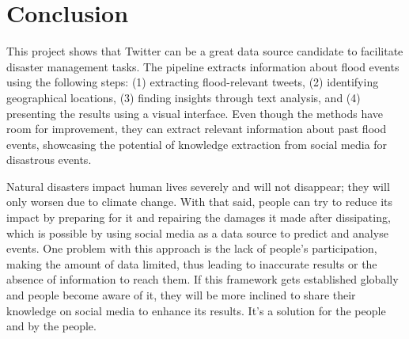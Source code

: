 \chapter{Conclusion}%
This project shows that Twitter can be a great data source candidate to facilitate disaster
management tasks. The pipeline extracts information about flood events using the following steps:
(1) extracting flood-relevant tweets, (2) identifying geographical locations, (3) finding insights
through text analysis, and (4) presenting the results using a visual interface. Even though the
methods have room for improvement, they can extract relevant information about past flood events,
showcasing the potential of knowledge extraction from social media for disastrous events.

Natural disasters impact human lives severely and will not disappear; they will only worsen due to
climate change. With that said, people can try to reduce its impact by preparing for it and
repairing the damages it made after dissipating, which is possible by using social media as a data
source to predict and analyse events. One problem with this approach is the lack of people's
participation, making the amount of data limited, thus leading to inaccurate results or the absence
of information to reach them. If this framework gets established globally and people become aware of
it, they will be more inclined to share their knowledge on social media to enhance its results. It's
a solution for the people and by the people.

